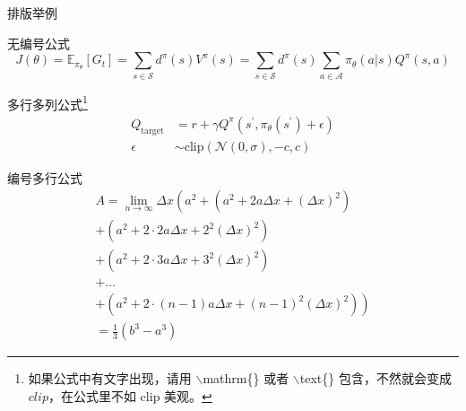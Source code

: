 \documentclass{beamer}
\begin{document}
	\begin{frame}{排版举例}
		\begin{exampleblock}{无编号公式} %
			\begin{equation*}
				J(\theta) = \mathbb{E}_{\pi_\theta}[G_t] = \sum_{s\in\mathcal{S}} d^\pi (s)V^\pi(s)=\sum_{s\in\mathcal{S}} d^\pi(s)\sum_{a\in\mathcal{A}}\pi_\theta(a|s)Q^\pi(s,a)
			\end{equation*}
		\end{exampleblock}
		\begin{exampleblock}{多行多列公式\footnote{如果公式中有文字出现，请用 $\backslash$mathrm\{\} 或者 $\backslash$text\{\} 包含，不然就会变成 $clip$，在公式里不如 $\mathrm{clip}$ 美观。}}
			\begin{align}
				Q_\mathrm{target}&=r+\gamma Q^\pi(s^\prime, \pi_\theta(s^\prime)+\epsilon)\\
				\epsilon&\sim\mathrm{clip}(\mathcal{N}(0, \sigma), -c, c)\nonumber
			\end{align}
		\end{exampleblock}
	\end{frame}
	
	\begin{frame}
		\begin{exampleblock}{编号多行公式}
			\begin{multline}
				A=\lim_{n\rightarrow\infty}\Delta x\left(a^{2}+\left(a^{2}+2a\Delta x+\left(\Delta x\right)^{2}\right)\right.\label{eq:reset}\\
				+\left(a^{2}+2\cdot2a\Delta x+2^{2}\left(\Delta x\right)^{2}\right)\\
				+\left(a^{2}+2\cdot3a\Delta x+3^{2}\left(\Delta x\right)^{2}\right)\\
				+\ldots\\
				\left.+\left(a^{2}+2\cdot(n-1)a\Delta x+(n-1)^{2}\left(\Delta x\right)^{2}\right)\right)\\
				=\frac{1}{3}\left(b^{3}-a^{3}\right)
			\end{multline}
		\end{exampleblock}
	\end{frame}
	
\end{document}
